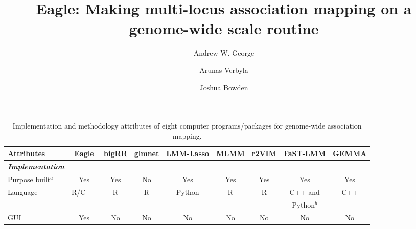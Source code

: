 \documentclass{article}
\begin{document}
\title{Eagle: Making multi-locus association mapping on a genome-wide scale routine}
\author[1]{Andrew W. George}
\author[1]{Arunas Verbyla}
\author[2]{Joshua Bowden}


\maketitle






\begin{landscape}

\begin{table}
\caption{Implementation and methodology attributes of eight computer programs/packages for genome-wide association mapping.  }
\label{suptabsummary}
\vspace{0.5cm}
\begin{tabular}{lcccccccc} \hline
                                                   Attributes                  & {\bf Eagle}                                 & {\bf bigRR}             & {\bf glmnet}            & {\bf LMM-Lasso}                    & {\bf MLMM} & {\bf r2VIM}      & {\bf FaST-LMM} & {\bf GEMMA} \\  \hline
{\bf {\em Implementation}}    &         &            &             &                   &            &                &      &      \\ [0.15cm]
\hspace{1mm}  Purpose built$^a$    &   Yes     &    Yes      &  No   &   Yes  &  Yes  &  Yes  & Yes  & Yes          \\ [0.15cm]


\hspace{1mm}  Language                 &  R/C++       &    R        &      R       &     Python     &  R          &    R         &  C++ and     &   C++   \\  
                                                          &         &            &             &                   &            &                                     &   Python$^b$       &      \\  [0.15cm]

\hspace{1mm} GUI                            & Yes &    No      & No          &  No    &  No    &   No     & No     & No    \\  [0.15cm]





\end{tabular}
\end{table}
\end{landscape}
\end{document}
